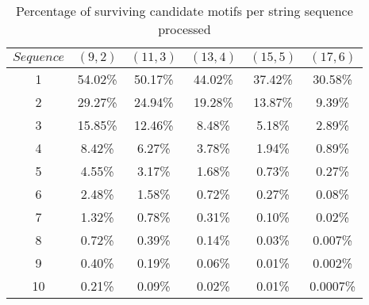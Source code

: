 \begin{table}[h] %
	\renewcommand{\arraystretch}{1.3}
	\caption{Percentage of surviving candidate motifs per string sequence processed}
	\label{tbl:surviving_candidate_motifs}
	\centering
	\begin{tabular}{|c|c|c|c|c|c|}
		\hline 
		\bfseries\boldmath $Sequence$ & 
		\bfseries\boldmath $(9,2)$ & 
		\bfseries\boldmath $(11,3)$ & 
		\bfseries\boldmath $(13,4)$ & 
		\bfseries\boldmath $(15,5)$ & 
		\bfseries\boldmath $(17,6)$ \\
		\hline
			1	& 	54.02\%	& 	50.17\%		& 	44.02\%		&	37.42\%		& 	30.58\%\\
			2	& 	29.27\%	& 	24.94\%		& 	19.28\%		&	13.87\% 	& 	9.39\%\\
			3	& 	15.85\%	& 	12.46\%		& 	8.48\%		&	5.18\% 		& 	2.89\%\\
			4	& 	8.42\%	& 	6.27\%		& 	3.78\% 		&	1.94\% 		& 	0.89\%\\
			5	& 	4.55\%	& 	3.17\% 		&	1.68\%		&	0.73\%		&	0.27\%\\
			6	& 	2.48\%	& 	1.58\%		& 	0.72\%		&	0.27\%		&	0.08\%\\
			7	& 	1.32\%	& 	0.78\%		& 	0.31\%		&	0.10\%		&	0.02\%\\
			8	& 	0.72\% 	&	0.39\%		& 	0.14\%		&	0.03\%		&	0.007\%\\
			9	& 	0.40\% 	& 	0.19\%		& 	0.06\%		&	0.01\%		&	0.002\%\\
			10	& 	0.21\% 	&	0.09\%		& 	0.02\%		&	0.01\%		&	0.0007\%\\
		\hline\end{tabular}
\end{table}